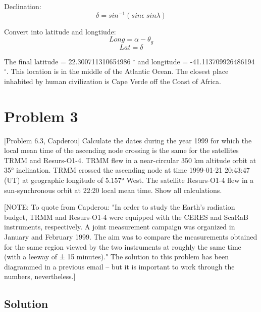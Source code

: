 \documentclass[conf]{new-aiaa}
\begin{document}
Declination: 
\begin{equation}
	\delta = sin^{-1} ( sin \epsilon \; sin \lambda )
\end{equation}

Convert into latitude and longtiude: 
\begin{equation}
	Long = \alpha - \theta_g 
\end{equation}
\begin{equation}
	Lat = \delta 
\end{equation}

The final latitude = 22.300711310654986 $^\circ$ and longitude = -41.113709926486194 $^\circ$. This location is in the middle of the Atlantic Ocean. The closest place inhabited by human civilization is Cape Verde off the Coast of Africa. 



\newpage 
\section*{Problem 3 } 
\vspace*{5mm}

[Problem 6.3, Capderou] Calculate the dates during the year 1999 for which the local mean
time of the ascending node crossing is the same for the satellites TRMM and Resurs-O1-4.
TRMM flew in a near-circular 350 km altitude orbit at 35° inclination. TRMM crossed the
ascending node at time 1999-01-21 20:43:47 (UT) at geographic longitude of 5.157° West.
The satellite Resurs-O1-4 flew in a sun-synchronous orbit at 22:20 local mean time. Show all
calculations. \newline

[NOTE: To quote from Capderou: "In order to study the Earth's radiation budget, TRMM
and Resurs-O1-4 were equipped with the CERES and ScaRaB instruments, respectively.
A joint measurement campaign was organized in January and February 1999. The aim
was to compare the measurements obtained for the same region viewed by the two
instruments at roughly the same time (with a leeway of ± 15 minutes)."
The solution to this problem has been diagrammed in a previous email – but it is
important to work through the numbers, nevertheless.] 

\subsection{Solution} 
\vspace*{5mm}
\end{document}
